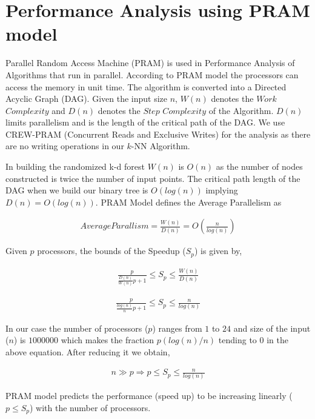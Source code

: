 \section{Performance Analysis using PRAM model}
  \label{sec:perf_analysis}

Parallel Random Access Machine (PRAM) is used in Performance Analysis of Algorithms that run in parallel. According to PRAM model the processors can access the memory in unit time. The algorithm is converted into a Directed Acyclic Graph (DAG). Given the input size $n$, $W(n)$ denotes the $Work$ $Complexity$ and $D(n)$ denotes the $Step$ $Complexity$ of the Algorithm. $D(n)$ limits parallelism and is the length of the critical path of the DAG. We use CREW-PRAM (Concurrent Reads and Exclusive Writes) for the analysis as there are no writing operations in our $k$-NN Algorithm. 

In building the randomized k-d forest $W(n)$ is $O(n)$ as the number of nodes constructed is twice the number of input points. The critical path length of the DAG when we build our binary tree is $O(log(n))$ implying $D(n) = O(log(n))$. PRAM Model defines the Average Parallelism as

\begin{align}
Average Parallism = \frac{W(n)}{D(n)} = O(\frac{n}{log(n)})
\end{align}
 
 Given $p$ processors, the bounds of the Speedup ($S_p$) is given by,
 
 \begin{align}
\frac{p}{\frac{D(n)}{W(n)} p+1} \leq S_p \leq \frac{W(n)}{D(n)}
\end{align}  

\begin{align}
\frac{p}{\frac{log(n)}{n} p+1} \leq S_p \leq \frac{n}{log(n)}
\end{align}
\label{eq:sp_bounds}

In our case the number of processors ($p$) ranges from $1$ to $24$ and size of the input ($n$) is $1000000$ which makes the fraction $p(log(n)/n)$ tending to $0$ in the above equation. After reducing it we obtain,

 \begin{align}
n\gg p \Rightarrow p \leq S_p \leq \frac{n}{log(n)} 
\end{align}
\label{eq:sp_bounds_min}

PRAM model predicts the performance (speed up) to be increasing linearly ($p \leq S_p$) with the number of processors. 
 

